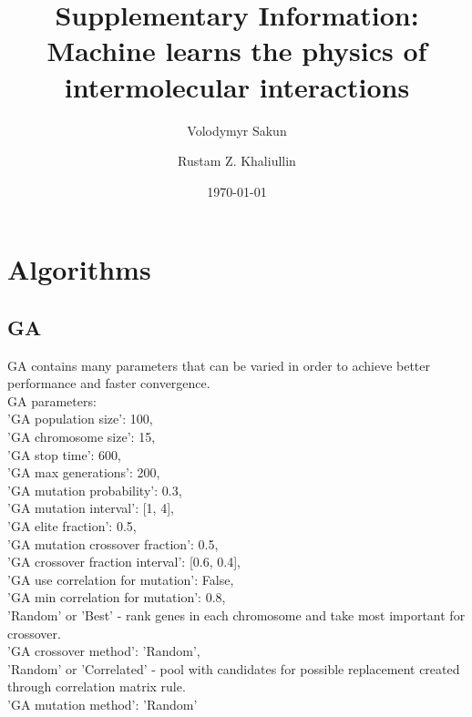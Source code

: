\documentclass[aip,jcp,reprint,amsmath,amssymb,nature]{revtex4-1}
\begin{document}
\title{Supplementary Information:\\Machine learns the physics of intermolecular interactions}

\author{Volodymyr Sakun}
\author{Rustam Z. Khaliullin}

\maketitle
\date{\today}

\renewcommand{\thefigure}{S\arabic{figure}}

\section{Algorithms}

\subsection{GA}


GA contains many parameters that can be varied in order to achieve better performance and faster convergence.\\ 
GA parameters:\\
'GA population size': 100,\\
'GA chromosome size': 15,\\
'GA stop time': 600,\\
'GA max generations': 200,\\
'GA mutation probability': 0.3,\\
'GA mutation interval': [1, 4],\\
'GA elite fraction': 0.5,\\
'GA mutation crossover fraction': 0.5,\\
'GA crossover fraction interval': [0.6, 0.4],\\
'GA use correlation for mutation': False,\\
'GA min correlation for mutation': 0.8,\\
'Random' or 'Best' - rank genes in each chromosome and take most important for crossover.\\
'GA crossover method': 'Random',\\
'Random' or 'Correlated' - pool with candidates for possible replacement created through correlation matrix rule.\\
'GA mutation method': 'Random'\\
            
\end{document}

